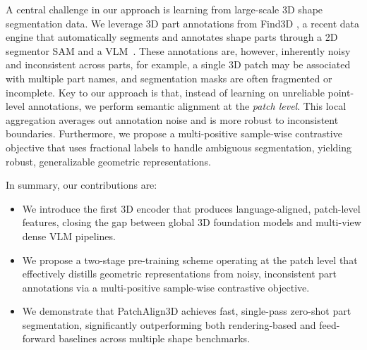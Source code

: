 A central challenge in our approach is learning from large-scale 3D shape segmentation data. We leverage 3D part annotations from Find3D \cite{ma2025find}, a recent data engine that automatically segments and annotates shape parts through a 2D segmentor SAM\cite{kirillov2023segment} and a VLM~\cite{team2023gemini}. These annotations are, however, inherently noisy and inconsistent across parts, for example, a single 3D patch may be associated with multiple part names, and segmentation masks are often fragmented or incomplete.
Key to our approach is that, instead of learning on unreliable point-level annotations, we perform semantic alignment at the \emph{patch level}. This local aggregation averages out annotation noise and is more robust to inconsistent boundaries. Furthermore, we propose a multi-positive sample-wise contrastive objective that uses fractional labels to handle ambiguous segmentation, yielding robust, generalizable geometric representations.



In summary, our contributions are: 
\begin{itemize}
    \item We introduce the first 3D encoder that produces language-aligned, patch-level features, closing the gap between global 3D foundation models and multi-view dense VLM pipelines.
    \item We propose a two-stage pre-training scheme operating at the patch level that effectively distills geometric representations from noisy, inconsistent part annotations via a multi-positive sample-wise contrastive objective.
    \item We demonstrate that PatchAlign3D achieves fast, single-pass zero-shot part segmentation, significantly outperforming both rendering-based and feed-forward baselines across multiple shape benchmarks.
\end{itemize}
